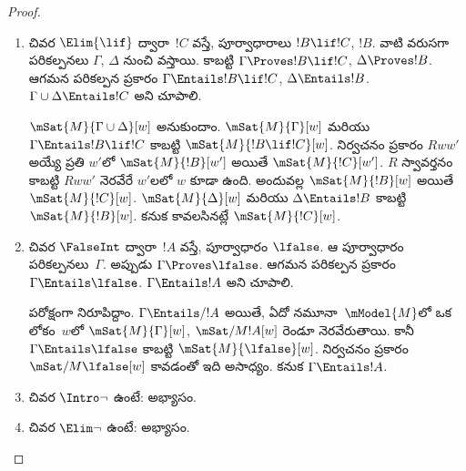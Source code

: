 \documentclass[../../../include/open-logic-section]{subfiles}
\begin{document}
\begin{proof}
\begin{enumerate}
    $\mSat{M}{\Gamma}[w]$ అనుకుందాం. $Rww'$
    అయ్యే ప్రతి $w'$లో $\mSat{M}{!B}[w']$
    అయితే $\mSat{M}{!C}[w']$ అని చూపాలి.
    కాబట్టి $Rww'$ మరియు $\mSat{M}{!B}[w']$
    అనుకుందాం. 
    ప్రకారం $\mSat{M}{\Gamma}[w']$.
    $\Gamma \cup \{!B\} \Entails !C$ కాబట్టి
    కావలసినట్లే $\mSat{M}{!C}[w']$.

  \item {}
    చివర $\Elim{\lif}$ ద్వారా~$!C$ వస్తే,
    పూర్వాధారాలు $!B \lif !C$, $!B$.
    వాటి 
    వరుసగా 
    పరికల్పనలు $\Gamma$, $\Delta$ నుంచి వస్తాయి.
    కాబట్టి $\Gamma \Proves !B \lif !C$,
    $\Delta
    \Proves !B$. ఆగమన పరికల్పన ప్రకారం
    $\Gamma \Entails !B \lif !C$, $\Delta
    \Entails !B$. $\Gamma \cup \Delta \Entails !C$
    అని చూపాలి.

    $\mSat{M}{\Gamma \cup \Delta}[w]$ అనుకుందాం.
    $\mSat{M}{\Gamma}[w]$ మరియు
    $\Gamma \Entails !B \lif !C$ కాబట్టి
    $\mSat{M}{!B \lif !C}[w]$. నిర్వచనం ప్రకారం
    $Rww'$ అయ్యే ప్రతి $w'$లో
    $\mSat{M}{!B}[w']$ అయితే
    $\mSat{M}{!C}[w']$. $R$ స్వావర్తనం కాబట్టి
    $Rww'$ నెరవేరే $w'$లలో $w$ కూడా ఉంది. అందువల్ల
    $\mSat{M}{!B}[w]$ అయితే
    $\mSat{M}{!C}[w]$. $\mSat{M}{\Delta}[w]$
    మరియు $\Delta
    \Entails !B$ కాబట్టి $\mSat{M}{!B}[w]$.
    కనుక కావలసినట్లే $\mSat{M}{!C}[w]$.

  \item {}
    చివర $\FalseInt$ ద్వారా~$!A$ వస్తే,
    పూర్వాధారం $\lfalse$. ఆ పూర్వాధారం
    పరికల్పనలు~$\Gamma$. అప్పుడు $\Gamma
    \Proves \lfalse$. ఆగమన పరికల్పన ప్రకారం
    $\Gamma \Entails \lfalse$. $\Gamma
    \Entails !A$ అని చూపాలి.

    పరోక్షంగా నిరూపిద్దాం. $\Gamma \Entails/ !A$
    అయితే, ఏదో నమూనా~$\mModel{M}$లో ఒక లోకం~$w$లో
    $\mSat{M}{\Gamma}[w]$, $\mSat/{M}{!A}[w]$
    రెండూ నెరవేరుతాయి. కానీ $\Gamma \Entails
    \lfalse$ కాబట్టి $\mSat{M}{\lfalse}[w]$.
    నిర్వచనం ప్రకారం $\mSat/{M}{\lfalse}[w]$
    కావడంతో ఇది అసాధ్యం. కనుక $\Gamma
    \Entails !A$.
  \item {}
    చివర $\Intro\lnot$ ఉంటే: అభ్యాసం.
  \item {}
    చివర $\Elim\lnot$ ఉంటే: అభ్యాసం.
  \end{enumerate}
\end{proof}
\end{document}
